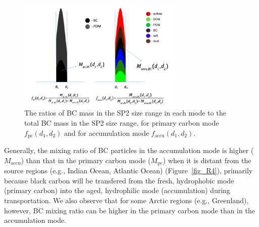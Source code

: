 \documentclass[12pt]{article}
\begin{document}
	\begin{figure}[H] 
		\begin{center}
			\includegraphics[width = 0.7\textwidth]{Rplot07}
			\caption[]{\label{fig_R3} The ratios of BC mass in the SP2 size range in each mode to the total BC mass in the SP2 size range, for primary carbon mode $f_{\text{pc}}(d_{1}, d_{2})$ and for accumulation mode $f_{\text{accu}}(d_{1}, d_{2})$.}
		\end{center}
	\end{figure}
	
	
	Generally, the mixing ratio of BC particles in the accumulation mode is higher ($M_{\text{accu}}$) than that in the primary carbon mode ($M_{\text{pc}}$) when it is distant from the source regions (e.g., Indian Ocean, Atlantic Ocean) (Figure~\ref{fig_R4}), primarily because black carbon will be transfered from the fresh, hydrophobic mode (primary carbon) into the aged, hydrophilic mode (accumulation) during transportation. We also observe that for some Arctic regions (e.g., Greenland), however, BC mixing ratio can be higher in the primary carbon mode than in the accumulation mode.
	
\end{document}
